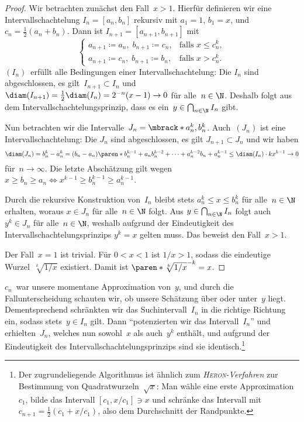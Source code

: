 \documentclass[a4paper]{article}
\begin{document}
\begin{proof}
    Wir betrachten zunächst den Fall~$x > 1$. Hierfür definieren wir eine Intervallschachtelung $I_n = [a_n, b_n]$ rekursiv mit $a_1 = 1$, $b_1 = x$, und $c_n = \frac{1}{2}(a_n + b_n)$. Dann ist $I_{n+1} = [a_{n+1}, b_{n+1}]$ mit
    \begin{equation*}
        \begin{cases}
            a_{n+1} \coloneqq a_n,\; b_{n+1} \coloneqq c_n, & \text{falls } x \leq c_n^k, \\
            a_{n+1} \coloneqq c_n,\; b_{n+1} \coloneqq b_n, & \text{falls } x > c_n^k.
        \end{cases}
    \end{equation*}
    $(I_n)$~erfüllt alle Bedingungen einer Intervallschachtelung: Die $I_n$ sind abgeschlossen, es gilt~$I_{n+1} \subset I_n$ und $\diam(I_{n+1}) = \frac{1}{2} \diam(I_n) = 2^{-n} (x-1) \to 0$ für alle~$n \in \N$. Deshalb folgt aus dem Intervallschachtelungsprinzip, dass es ein~$y \in \bigcap_{n\in\N} I_n$ gibt.

    Nun betrachten wir die Intervalle~$J_n = \mbrack*{a_n^k, b_n^k}$. Auch~$(J_n)$ ist eine Intervallschachtelung: Die $J_n$ sind abgeschlossen, es gilt $J_{n+1} \subset J_n$ und wir haben
    \begin{equation*}
        \diam(J_n) = b_n^k - a_n^k = (b_n - a_n) \paren*{b_n^{k-1} + a_n b_n^{k-2} + \dots + a_n^{k-2} b_n + a_n^{k-1}} \leq \diam(I_n) \cdot k x^{k-1} \to 0
    \end{equation*}
    für~$n \to \infty$. Die letzte Abschätzung gilt wegen $x \geq b_n \geq a_n \iff x^{k-1} \geq b_n^{k-1} \geq a_n^{k-1}$.

    Durch die rekursive Konstruktion von~$I_n$ bleibt stets $a_n^k \leq x \leq b_n^k$ für alle~$n \in \N$ erhalten, woraus $x \in J_n$ für alle~$n \in \N$ folgt. Aus $y \in \bigcap_{n\in\N} I_n$ folgt auch $y^k \in J_n$ für alle~$n \in \N$, weshalb aufgrund der Eindeutigkeit des Intervallschachtelungsprinzips $y^k = x$ gelten muss. Das beweist den Fall~$x > 1$.

    Der Fall~$x = 1$ ist trivial. Für $0 < x < 1$ ist $1/x > 1$, sodass die eindeutige Wurzel~$\sqrt[k]{1/x}$ existiert. Damit ist $\paren*{\sqrt[k]{1/x}}^{-k} = x$.
\end{proof}

$c_n$~war unsere momentane Approximation von~$y$, und durch die Fallunterscheidung schauten wir, ob unsere Schätzung über oder unter~$y$ liegt. Dementsprechend schränkten wir das Suchintervall~$I_n$ in die richtige Richtung ein, sodass stets~$y \in I_n$ gilt. Dann "`potenzierten wir das Intervall~$I_n$"' und erhielten~$J_n$, welches nun sowohl~$x$ als auch~$y^k$ enthält, und aufgrund der Eindeutigkeit des Intervallschachtelungsprinzips sind sie identisch.\footnote{Der zugrundeliegende Algorithmus ist ähnlich zum \emph{\textsc{Heron}-Verfahren} zur Bestimmung von Quadratwurzeln~$\sqrt{x}$: Man wähle eine erste Approximation~$c_1$, bilde das Intervall $[c_1, x/c_1] \ni x$ und schränke das Intervall mit $c_{n+1} = \frac{1}{2} (c_1 + x/c_1)$, also dem Durchschnitt der Randpunkte.}
\end{document}
